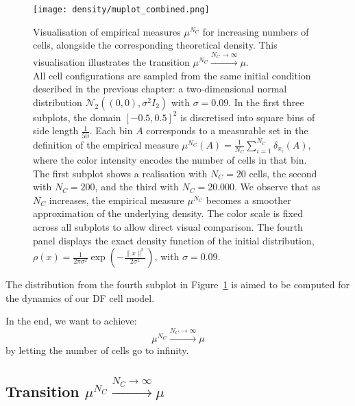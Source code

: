 \begin{figure}
	\begin{center}
		\texttt{[image: density/muplot\_combined.png]}
		\caption{
            Visualisation of empirical measures $\mu^{N_C}$ for increasing numbers of cells, alongside the corresponding theoretical density. 
            This visualisation illustrates the transition \( \mu^{N_C} \xrightarrow{N_C \to \infty} \mu\). \\
            All cell configurations are sampled from the same initial condition described in the previous chapter: a two-dimensional normal distribution \( \mathcal{N}_2((0,0), \sigma^2 I_2) \) with \( \sigma = 0.09 \). 
            In the first three subplots, the domain \([-0.5, 0.5]^2\) is discretised into square bins of side length \(\frac{1}{50}\). 
            Each bin \( A \) corresponds to a measurable set in the definition of the empirical measure \( \mu^{N_C}(A) = \frac{1}{N_C} \sum_{i=1}^{N_C} \delta_{x_i}(A) \), where the color intensity encodes the number of cells in that bin. \\
            The first subplot shows a realisation with \( N_C = 20 \) cells, the second with \( N_C = 200 \), and the third with \( N_C = 20{.}000 \). 
            We observe that as \( N_C \) increases, the empirical measure \( \mu^{N_C} \) becomes a smoother approximation of the underlying density. 
            The color scale is fixed across all subplots to allow direct visual comparison.
            The fourth panel displays the exact density function of the initial distribution, \( \rho(x) = \frac{1}{2\pi\sigma^2} \exp\left( -\frac{\|x\|^2}{2\sigma^2} \right) \), with \( \sigma = 0.09 \). 
         }
		\label{fig:muTransition}
	\end{center}
\end{figure}

The distribution from the fourth subplot in Figure~\ref{fig:muTransition} is aimed to be computed for the dynamics of our DF cell model. 

In the end, we want to achieve:
\[ \mu^{N_C} \xrightarrow{N_C \to \infty} \mu\]
by letting the number of cells go to infinity. \\

\subsection{Transition $\mu^{N_C} \xrightarrow{N_C \to \infty} \mu$ }


